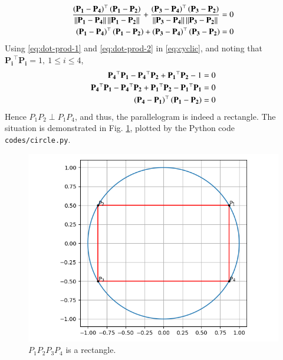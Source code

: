 \documentclass[journal,12pt,twocolumn]{IEEEtran}
\renewcommand{\vec}[1]{\boldsymbol{\mathbf{#1}}}
\begin{document}
\begin{enumerate}
\begin{align}
        \frac{\brak{\vec{P_1}-\vec{P_4}}^\top\brak{\vec{P_1}-\vec{P_2}}}{\norm{\vec{P_1}-\vec{P_4}}\norm{\vec{P_1}-\vec{P_2}}} + \frac{\brak{\vec{P_3}-\vec{P_4}}^\top\brak{\vec{P_3}-\vec{P_2}}}{\norm{\vec{P_3}-\vec{P_4}}\norm{\vec{P_3}-\vec{P_2}}} = 0 \\
        \brak{\vec{P_1}-\vec{P_4}}^\top\brak{\vec{P_1}-\vec{P_2}} + \brak{\vec{P_3}-\vec{P_4}}^\top\brak{\vec{P_3}-\vec{P_2}} = 0
        \label{eq:cyclic}
    \end{align}
    Using \eqref{eq:dot-prod-1} and \eqref{eq:dot-prod-2} in \eqref{eq:cyclic},
    and noting that $\vec{P_i}^\top\vec{P_i} = 1,\ 1 \le i \le 4$,
    \begin{align}
        \vec{P_4}^\top\vec{P_1}-\vec{P_4}^\top\vec{P_2}+\vec{P_1}^\top\vec{P_2}-1 &= 0 \\
        \vec{P_4}^\top\vec{P_1}-\vec{P_4}^\top\vec{P_2}+\vec{P_1}^\top\vec{P_2}-\vec{P_1}^\top\vec{P_1} &= 0 \\
        \brak{\vec{P_4}-\vec{P_1}}^\top\brak{\vec{P_1}-\vec{P_2}} &= 0
        \label{eq:ortho}
    \end{align}
    Hence $P_1P_2 \perp P_1P_4$, and thus, the parallelogram is indeed a rectangle.
    The situation is demonstrated in Fig. \ref{fig:circle}, plotted by the Python
    code \texttt{codes/circle.py}.
    \begin{figure}[!ht]
        \centering
        \includegraphics[width=\columnwidth]{figs/circle.png}
        \caption{$P_1P_2P_3P_4$ is a rectangle.}
        \label{fig:circle}
    \end{figure}
\end{enumerate}
\end{document}
